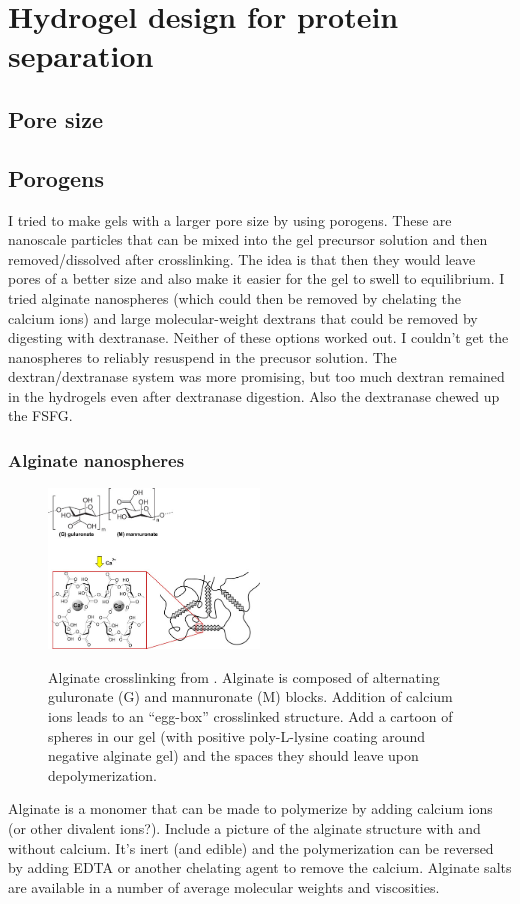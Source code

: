 \chapter{Hydrogel design for protein separation}\label{ch03}
\section{Pore size}
\section{Porogens}
I tried to make gels with a larger pore size by using porogens.  These are nanoscale particles that can be mixed into the gel precursor solution and then removed/dissolved after crosslinking.  The idea is that then they would leave pores of a better size and also make it easier for the gel to swell to equilibrium.  I tried alginate nanospheres (which could then be removed by chelating the calcium ions) and large molecular-weight dextrans that could be removed by digesting with dextranase.  Neither of these options worked out.  I couldn't get the nanospheres to reliably resuspend in the precusor solution.  The dextran/dextranase system was more promising, but too much dextran remained in the hydrogels even after dextranase digestion.  Also the dextranase chewed up the FSFG.

\subsection{Alginate nanospheres}
\begin{figure}
\caption{Alginate crosslinking from \cite{bruchet15}. Alginate is composed of alternating guluronate (G) and mannuronate (M) blocks.  Addition of calcium ions leads to an ``egg-box'' crosslinked structure. Add a cartoon of spheres in our gel (with positive poly-L-lysine coating around negative alginate gel) and the spaces they should leave upon depolymerization.}
\centering
\includegraphics[width=0.5\textwidth]{figs/ch03/alginate-crosslinking}
\label{fig:alginate}
\end{figure}
Alginate is a monomer that can be made to polymerize by adding calcium ions (or other divalent ions?).  Include a picture of the alginate structure with and without calcium.  It's inert (and edible) and the polymerization can be reversed by adding EDTA or another chelating agent to remove the calcium.  Alginate salts are available in a number of average molecular weights and viscosities.

